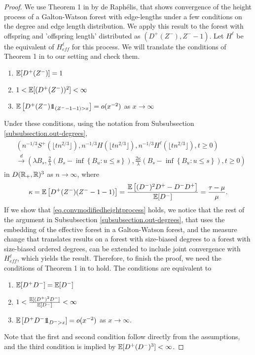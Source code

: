 \begin{proof}
We use Theorem 1 in \cite{Deraphelis2017} by de Raphélis, that shows convergence of the height process of a Galton-Watson forest with edge-lengths under a few conditions on the degree and edge length distribution. We apply this result to the forest with offspring and 'offspring length' distributed as $(D^+(Z^-),Z^--1)$. Let $H^\ell$ be the equivalent of $H^\ell_{eff}$ for this process. We will translate the conditions of Theorem 1 in \cite{Deraphelis2017} to our setting and check them. 
\begin{enumerate}
    \item ${\mathbb E}[D^+(Z^-)]=1$
    \item $1<{\mathbb E}[(D^+(Z^-))^2]<\infty$
    \item $\E\left[D^+(Z^-)\one_{(Z^--1-1)>x}\right]=o(x^{-2})$ as $x\to \infty$
\end{enumerate}
Under these conditions, using the notation from Subsubsection \ref{subsubsection.out-degrees},
\begin{align}\begin{split}\label{eq.convmodifiedheightprocess}
&\left(n^{-1/3}S^+\left(\lfloor t n^{2/3}\rfloor \right),n^{-1/3}H\left(\lfloor t n^{2/3}\rfloor \right), n^{-1/3}H^\ell\left(\lfloor t n^{2/3}\rfloor \right),t\geq 0\right)\\
&\overset{d}{\to}\left(\lambda B_s, \frac{2}{\lambda}\left(B_s-\inf\left\{B_u:u\leq s\right\}\right), \frac{2\kappa}{\lambda}\left(B_s-\inf\left\{B_u:u\leq s\right\}\right),t\geq 0\right)
\end{split}\end{align}
in $D({\mathbb R}_+,{\mathbb R})^3$ as $n\to\infty$, where $$\kappa={\mathbb E}\left[D^+(Z^-)(Z^--1-1)\right]=\frac{{\mathbb E}\left[(D^-)^2D^+-D^-D^+\right]}{{\mathbb E}[D^-]}=\frac{\tau-\mu}{\mu}.$$
If we show that \eqref{eq.convmodifiedheightprocess} holds, we notice that the rest of the argument in Subsubsection \ref{subsubsection.out-degrees}, that uses the embedding of the effective forest in a Galton-Watson forest, and the measure change that translates results on a forest with size-biased degrees to a forest with size-biased ordered degrees, can be extended to include joint convergence with $H^\ell_{eff}$, which yields the result. 
Therefore, to finish the proof, we need the conditions of Theorem 1 in \cite{Deraphelis2017} to hold. The conditions are equivalent to 
\begin{enumerate}
    \item ${\mathbb E}[D^+D^-]={\mathbb E}[D^-]$
    \item $1<\frac{{\mathbb E}[(D^+)^2D^-]}{{\mathbb E}[D^-]}<\infty$
    \item $\E\left[D^+D^-\one_{D^->x}\right]=o(x^{-2})$ as $x\to \infty$. 
\end{enumerate}
Note that the first and second condition follow directly from the assumptions, and the third condition is implied by ${\mathbb E}[D^+(D^-)^3]<\infty$.
\end{proof}
